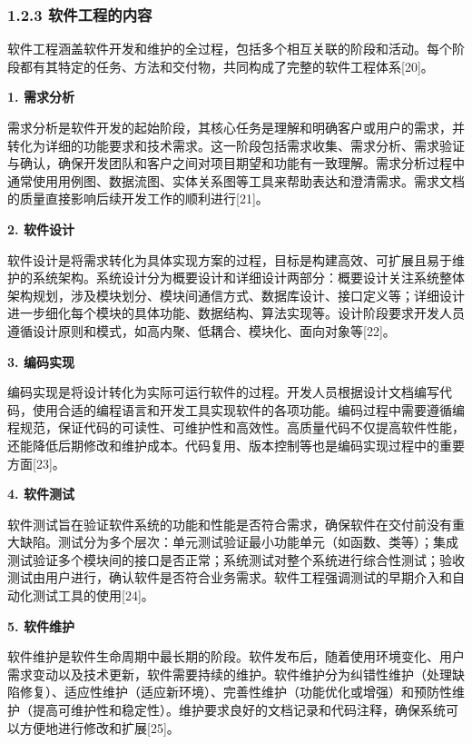 \documentclass[12pt,a4paper]{article}
\begin{document}
\subsubsection{1.2.3
软件工程的内容}\label{ux8f6fux4ef6ux5de5ux7a0bux7684ux5185ux5bb9}

软件工程涵盖软件开发和维护的全过程，包括多个相互关联的阶段和活动。每个阶段都有其特定的任务、方法和交付物，共同构成了完整的软件工程体系{[}20{]}。

\textbf{1. 需求分析}

需求分析是软件开发的起始阶段，其核心任务是理解和明确客户或用户的需求，并转化为详细的功能要求和技术需求。这一阶段包括需求收集、需求分析、需求验证与确认，确保开发团队和客户之间对项目期望和功能有一致理解。需求分析过程中通常使用用例图、数据流图、实体关系图等工具来帮助表达和澄清需求。需求文档的质量直接影响后续开发工作的顺利进行{[}21{]}。

\textbf{2. 软件设计}

软件设计是将需求转化为具体实现方案的过程，目标是构建高效、可扩展且易于维护的系统架构。系统设计分为概要设计和详细设计两部分：概要设计关注系统整体架构规划，涉及模块划分、模块间通信方式、数据库设计、接口定义等；详细设计进一步细化每个模块的具体功能、数据结构、算法实现等。设计阶段要求开发人员遵循设计原则和模式，如高内聚、低耦合、模块化、面向对象等{[}22{]}。

\textbf{3. 编码实现}

编码实现是将设计转化为实际可运行软件的过程。开发人员根据设计文档编写代码，使用合适的编程语言和开发工具实现软件的各项功能。编码过程中需要遵循编程规范，保证代码的可读性、可维护性和高效性。高质量代码不仅提高软件性能，还能降低后期修改和维护成本。代码复用、版本控制等也是编码实现过程中的重要方面{[}23{]}。

\textbf{4. 软件测试}

软件测试旨在验证软件系统的功能和性能是否符合需求，确保软件在交付前没有重大缺陷。测试分为多个层次：单元测试验证最小功能单元（如函数、类等）；集成测试验证多个模块间的接口是否正常；系统测试对整个系统进行综合性测试；验收测试由用户进行，确认软件是否符合业务需求。软件工程强调测试的早期介入和自动化测试工具的使用{[}24{]}。

\textbf{5. 软件维护}

软件维护是软件生命周期中最长期的阶段。软件发布后，随着使用环境变化、用户需求变动以及技术更新，软件需要持续的维护。软件维护分为纠错性维护（处理缺陷修复）、适应性维护（适应新环境）、完善性维护（功能优化或增强）和预防性维护（提高可维护性和稳定性）。维护要求良好的文档记录和代码注释，确保系统可以方便地进行修改和扩展{[}25{]}。
\end{document}
